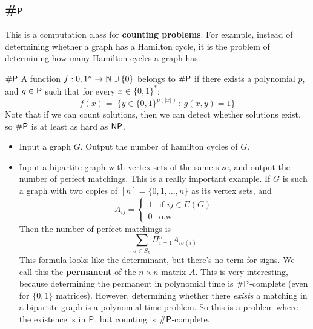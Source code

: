 \documentclass{article}
\begin{document}
\subsection{\#$\mathsf{P}$}
This is a computation class for \textbf{counting problems}. For example, instead of determining whether a graph has a Hamilton cycle, it is the problem of determining how many Hamilton cycles a graph has.
\begin{fancydefine}{$\#\mathsf{P}$}
    A function $f: {0,1}^{n} \to \mathbb{N} \cup \{0\}$ belongs to $\#\mathsf{P}$ if there exists a polynomial $p$, and $g\in \mathsf{P}$ such that for every $x \in \{0,1\}^{*}$: \[ f(x) = | \{ y \in \{0,1\}^{p(|x|)} \, : \, g(x,y)=1\}\]
    Note that if we can count solutions, then we can detect whether solutions exist, so $\#\mathsf{P}$ is at least as hard as $\mathsf{NP}$.
\end{fancydefine}
\begin{exs*}\hspace{0.1cm}
    \begin{itemize}
        \item Input a graph $G$. Output the number of hamilton cycles of $G$. 
        \item Input a bipartite graph with vertex sets of the same size, and output the number of perfect matchings. This is a really important example. If $G$ is such a graph with two copies of $[n]=\{0,1,\dots,n\}$ as its vertex sets, and \[ A_{ij} = \begin{cases}
            1 & \text{if $ij \in E(G)$}\\
            0 & \text{o.w.}
        \end{cases}\]
        Then the number of perfect matchings is \[ \sum_{\sigma \in S_{n}} \Pi_{i=1}^{n}A_{i\sigma(i)}\]
        This formula looks like the determinant, but there's no term for signs. We call this the \textbf{permanent} of the $n\times n$ matrix $A$. This is very interesting, because determining the permanent in polynomial time is $\# \mathsf{P}$-complete (even for $\{0,1\}$ matrices). However, determining whether there \textit{exists} a matching in a bipartite graph is a polynomial-time problem. So this is a problem where the existence is in $\mathsf{P}$, but counting is $\# \mathsf{P}$-complete.
    \end{itemize}
\end{exs*}
\end{document}
